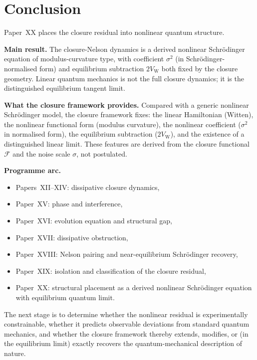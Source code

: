 \documentclass[12pt]{article}
\newcommand{\Fcal}{\mathcal{F}}
\newcommand{\VW}{V_{\mathrm{W}}}
\begin{document}
\section{Conclusion}\label{sec:conclusion}

Paper~XX places the closure residual into nonlinear quantum structure.

\textbf{Main result.} The closure-Nelson dynamics is a derived nonlinear Schr\"odinger equation of modulus-curvature type, with coefficient $\sigma^2$ (in Schr\"odinger-normalised form) and equilibrium subtraction $2\VW$ both fixed by the closure geometry. Linear quantum mechanics is not the full closure dynamics; it is the distinguished equilibrium tangent limit.

\textbf{What the closure framework provides.} Compared with a generic nonlinear Schr\"odinger model, the closure framework fixes: the linear Hamiltonian (Witten), the nonlinear functional form (modulus curvature), the nonlinear coefficient ($\sigma^2$ in normalised form), the equilibrium subtraction ($2\VW$), and the existence of a distinguished linear limit. These features are derived from the closure functional $\Fcal$ and the noise scale $\sigma$, not postulated.

\textbf{Programme arc.}
\begin{itemize}
    \item Papers~XII--XIV: dissipative closure dynamics,
    \item Paper~XV: phase and interference,
    \item Paper~XVI: evolution equation and structural gap,
    \item Paper~XVII: dissipative obstruction,
    \item Paper~XVIII: Nelson pairing and near-equilibrium Schr\"odinger recovery,
    \item Paper~XIX: isolation and classification of the closure residual,
    \item Paper~XX: structural placement as a derived nonlinear Schr\"odinger equation with equilibrium quantum limit.
\end{itemize}

The next stage is to determine whether the nonlinear residual is experimentally constrainable, whether it predicts observable deviations from standard quantum mechanics, and whether the closure framework thereby extends, modifies, or (in the equilibrium limit) exactly recovers the quantum-mechanical description of nature.



\end{document}
